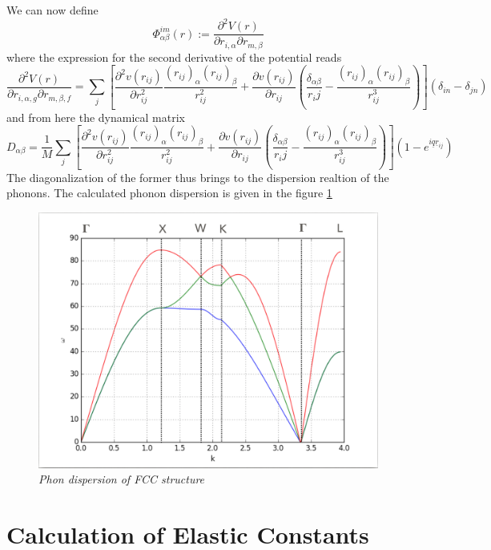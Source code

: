 \documentclass[a4paper]{article}
\begin{document}
        
        We can now define 
        \begin{equation}
            \Phi_{\alpha\beta}^{im}(r):=\frac{\partial^2 V(r)}{\partial r_{i,\alpha}\partial r_{m,\beta}}
        \end{equation}
        where the expression for the second derivative of the potential reads
        \begin{equation*}
            \frac{\partial^2 V(r)}{\partial r_{i,\alpha,g}\partial r_{m,\beta,f}} = \sum_j\left[\frac{\partial^2 v(r_{ij})}{\partial r_{ij}^2}\frac{(r_{ij})_{\alpha}(r_{ij})_{\beta}}{r_{ij}^2} + \frac{\partial v(r_{ij})}{\partial r_{ij}}\left(\frac{\delta_{\alpha\beta}}{r_ij}-\frac{(r_{ij})_{\alpha}(r_{ij})_{\beta}}{r_{ij}^3}\right)\right](\delta_{in}-\delta_{jn})
        \end{equation*}
        and from here the dynamical matrix
        \begin{equation}
            D_{\alpha\beta} = \frac{1}{M}\sum_j\left[\frac{\partial^2 v(r_{ij})}{\partial r_{ij}^2}\frac{(r_{ij})_{\alpha}(r_{ij})_{\beta}}{r_{ij}^2} + \frac{\partial v(r_{ij})}{\partial r_{ij}}\left(\frac{\delta_{\alpha\beta}}{r_ij}-\frac{(r_{ij})_{\alpha}(r_{ij})_{\beta}}{r_{ij}^3}\right)\right]\left(1-e^{i\underline{q}\underline{r}_{ij}}\right)
        \end{equation}
        The diagonalization of the former thus brings to the dispersion realtion of the phonons. The calculated phonon dispersion is given in the figure \ref{phonon-fcc}
\begin{figure}[h]
    \centering
    \includegraphics[width=12cm]{phonon_fcc.png}
    \caption{\it \label{phonon-fcc}Phon dispersion of FCC structure}
\end{figure}
%
%
\section{Calculation of Elastic Constants}
\end{document}
